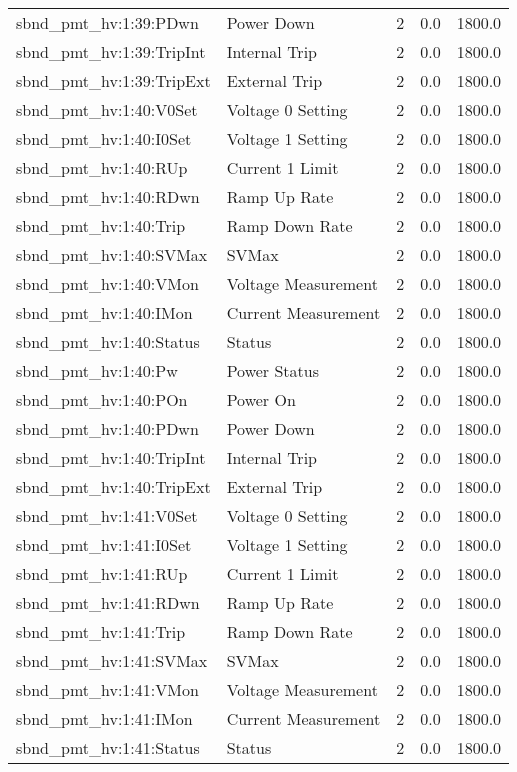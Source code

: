 \begin{center}
\begin{longtable}{l | l l l l }
sbnd\_pmt\_hv:1:39:PDwn & Power Down & 2 & 0.0 & 1800.0\\ 
sbnd\_pmt\_hv:1:39:TripInt & Internal Trip & 2 & 0.0 & 1800.0\\ 
sbnd\_pmt\_hv:1:39:TripExt & External Trip & 2 & 0.0 & 1800.0\\ 
sbnd\_pmt\_hv:1:40:V0Set & Voltage 0 Setting & 2 & 0.0 & 1800.0\\ 
sbnd\_pmt\_hv:1:40:I0Set & Voltage 1 Setting & 2 & 0.0 & 1800.0\\ 
sbnd\_pmt\_hv:1:40:RUp & Current 1 Limit & 2 & 0.0 & 1800.0\\ 
sbnd\_pmt\_hv:1:40:RDwn & Ramp Up Rate & 2 & 0.0 & 1800.0\\ 
sbnd\_pmt\_hv:1:40:Trip & Ramp Down Rate & 2 & 0.0 & 1800.0\\ 
sbnd\_pmt\_hv:1:40:SVMax & SVMax & 2 & 0.0 & 1800.0\\ 
sbnd\_pmt\_hv:1:40:VMon & Voltage Measurement & 2 & 0.0 & 1800.0\\ 
sbnd\_pmt\_hv:1:40:IMon & Current Measurement & 2 & 0.0 & 1800.0\\ 
sbnd\_pmt\_hv:1:40:Status & Status & 2 & 0.0 & 1800.0\\ 
sbnd\_pmt\_hv:1:40:Pw & Power Status & 2 & 0.0 & 1800.0\\ 
sbnd\_pmt\_hv:1:40:POn & Power On & 2 & 0.0 & 1800.0\\ 
sbnd\_pmt\_hv:1:40:PDwn & Power Down & 2 & 0.0 & 1800.0\\ 
sbnd\_pmt\_hv:1:40:TripInt & Internal Trip & 2 & 0.0 & 1800.0\\ 
sbnd\_pmt\_hv:1:40:TripExt & External Trip & 2 & 0.0 & 1800.0\\ 
sbnd\_pmt\_hv:1:41:V0Set & Voltage 0 Setting & 2 & 0.0 & 1800.0\\ 
sbnd\_pmt\_hv:1:41:I0Set & Voltage 1 Setting & 2 & 0.0 & 1800.0\\ 
sbnd\_pmt\_hv:1:41:RUp & Current 1 Limit & 2 & 0.0 & 1800.0\\ 
sbnd\_pmt\_hv:1:41:RDwn & Ramp Up Rate & 2 & 0.0 & 1800.0\\ 
sbnd\_pmt\_hv:1:41:Trip & Ramp Down Rate & 2 & 0.0 & 1800.0\\ 
sbnd\_pmt\_hv:1:41:SVMax & SVMax & 2 & 0.0 & 1800.0\\ 
sbnd\_pmt\_hv:1:41:VMon & Voltage Measurement & 2 & 0.0 & 1800.0\\ 
sbnd\_pmt\_hv:1:41:IMon & Current Measurement & 2 & 0.0 & 1800.0\\ 
sbnd\_pmt\_hv:1:41:Status & Status & 2 & 0.0 & 1800.0\\ 

\end{longtable}
\end{center}
